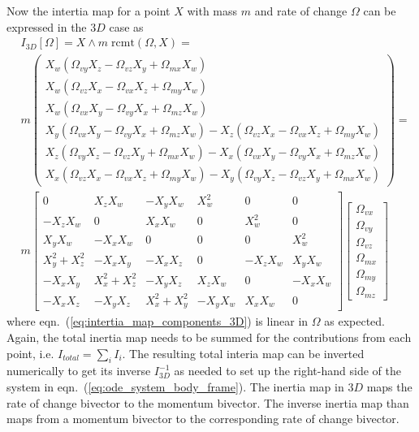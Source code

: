 Now the intertia map for a point $X$ with mass $m$ and rate of change $\Omega$ can be
expressed in the $3D$ case as
\begin{align}
    &I_{3D}[\Omega] = X \wedge m \; \mathrm{rcmt}(\Omega,X) = \nonumber \\[10pt]
    &m 
    \begin{pmatrix}
        X_w (\Omega_{vy} X_z - \Omega_{vz} X_y + \Omega_{mx} X_w) \\
        X_w (\Omega_{vz} X_x - \Omega_{vx} X_z + \Omega_{my} X_w) \\
        X_w (\Omega_{vx} X_y - \Omega_{vy} X_x + \Omega_{mz} X_w) \\
        X_y (\Omega_{vx} X_y - \Omega_{vy} X_x + \Omega_{mz} X_w) 
      - X_z (\Omega_{vz} X_x - \Omega_{vx} X_z + \Omega_{my} X_w) \\
        X_z (\Omega_{vy} X_z - \Omega_{vz} X_y + \Omega_{mx} X_w)
      - X_x (\Omega_{vx} X_y - \Omega_{vy} X_x + \Omega_{mz} X_w) \\
        X_x (\Omega_{vz} X_x - \Omega_{vx} X_z + \Omega_{my} X_w) - X_y (\Omega_{vy} X_z -
      \Omega_{vz} X_y + \Omega_{mx} X_w) \end{pmatrix} = \nonumber \\[10pt]
    &m
    \begin{bmatrix}
      0              &  X_z X_w       & -X_y X_w       & X_w^2    &  0       &  0       \\
      -X_z X_w       &  0             &  X_x X_w       & 0        &  X_w^2   &  0       \\
       X_y X_w       & -X_x X_w       &  0             & 0        &  0       &  X_w^2   \\
       X_y^2 + X_z^2 & -X_x X_y       & -X_x X_z       & 0        & -X_z X_w &  X_y X_w \\
      -X_x X_y       &  X_x^2 + X_z^2 & -X_y X_z       &  X_z X_w &  0       & -X_x X_w \\
      -X_x X_z       & -X_y X_z       &  X_x^2 + X_y^2 & -X_y X_w &  X_x X_w &  0
    \end{bmatrix}
    \begin{bmatrix}
        \Omega_{vx} \\ \Omega_{vy} \\ \Omega_{vz} \\
        \Omega_{mx} \\ \Omega_{my} \\ \Omega_{mz}
    \end{bmatrix} 
    \label{eq:intertia_map_components_3D}   
\end{align}
where eqn.~(\ref{eq:intertia_map_components_3D}) is linear in $\Omega$ as expected. Again,
the total inertia map needs to be summed for the contributions from each point, i.e.
$I_{total} = \sum_i{I_i}$. The resulting total interia map can be inverted numerically to
get its inverse $I_{3D}^{-1}$ as needed to set up the right-hand side of the system in
eqn.~(\ref{eq:ode_system_body_frame}). The inertia map in $3D$ maps the rate of change
bivector to the momentum bivector. The inverse inertia map than maps from a momentum
bivector to the corresponding rate of change bivector.\\

